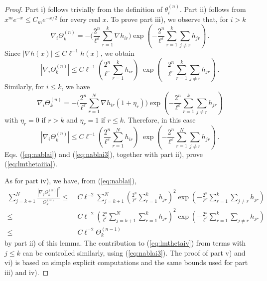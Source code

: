 \documentclass[11pt]{article}
\newcommand{\eps}{\varepsilon}
\begin{document}
\begin{proof}
Part i) follows trivially from the definition of $\theta_i^{(n)}$.
Part ii) follows from $x^{m} e^{-x} \leq C_{m} e^{-x/2}$ for every
real $x$. To prove part iii), we observe that, for $i >k$
\begin{equation}
\nabla_i \Theta_k^{(n)} = -\Big(\frac{2^n}{\ell^{\eps}} \sum_{r=1}^k
\nabla h_{ir} \Big)\exp \left( -\frac{2^n}{\ell^{\eps}} \sum_{r=1}^k
\sum_{j \neq r} h_{jr} \right)\,.
\end{equation}
Since $|\nabla h (x)| \leq C \ell^{-1} h(x)$, we obtain
\begin{equation}\label{eq:nablai}
\left|\nabla_i \Theta_k^{(n)} \right| \leq C \ell^{-1} \left(
\frac{2^{n}}{\ell^{\eps}} \sum_{r=1}^k h_{ir} \right) \; \exp \left(
-\frac{2^n}{\ell^{\eps}} \sum_{r=1}^k \sum_{j \neq r} h_{jr}
\right)\, .
\end{equation}
Similarly, for $i \leq k$, we have
\begin{equation}
\nabla_i \Theta_k^{(n)} = - \Bigg(\frac{2^n}{\ell^{\eps}} \sum_{r=1}^N
\nabla h_{ir} (1+\eta_r) \Bigg)\exp \left( -\frac{2^n}{\ell^{\eps}}
\sum_{r=1}^k \sum_{j \neq r} h_{jr} \right)
\end{equation}
with $\eta_r =0$ if $r >k$ and $\eta_r =1$ if $r \leq k$. Therefore,
in this case
\begin{equation}\label{eq:nablai3}
\left|\nabla_i \Theta_k^{(n)} \right| \leq C \ell^{-1} \left(
\frac{2^{n}}{\ell^{\eps}} \sum_{r=1}^N h_{ir} \right) \; \exp \left(
-\frac{2^n}{\ell^{\eps}} \sum_{r=1}^N \sum_{j \neq r} h_{jr}
\right)\,.
\end{equation}
Eqs. (\ref{eq:nablai}) and (\ref{eq:nablai3}), together with part
ii), prove (\ref{eq:lmthetaiiia}).

As for part iv), we have, from (\ref{eq:nablai}),
\begin{equation}
\begin{split}
\sum_{j=k+1}^N \frac{\left|\nabla_j \Theta_k^{(n)}
\right|^2}{\Theta_k^{(n)}} \leq \; &C \ell^{-2} \sum_{j=k+1}^N
\left( \frac{2^{n}}{\ell^{\eps}} \sum_{r=1}^k h_{jr} \right)^2 \exp
\left( -\frac{2^n}{\ell^{\eps}} \sum_{r=1}^k \sum_{j \neq r} h_{jr}
\right)
\\ \leq \; & C \ell^{-2} \left( \frac{2^{n}}{\ell^{\eps}} \sum_{j=k+1}^N
\sum_{r=1}^k h_{jr} \right)^2 \exp \left( -\frac{2^n}{\ell^{\eps}}
\sum_{r=1}^k \sum_{j \neq r} h_{jr} \right)
\\ \leq \; &C \ell^{-2} \Theta_k^{(n-1)}
\end{split}
\end{equation}
by part ii) of this lemma. The contribution to (\ref{eq:lmthetaiv})
from terms with $j \leq k$ can be controlled similarly, using
(\ref{eq:nablai3}). The proof of part v) and vi) is based on simple
explicit computations and the same bounds used for part iii) and
iv).
\end{proof}
\end{document}
